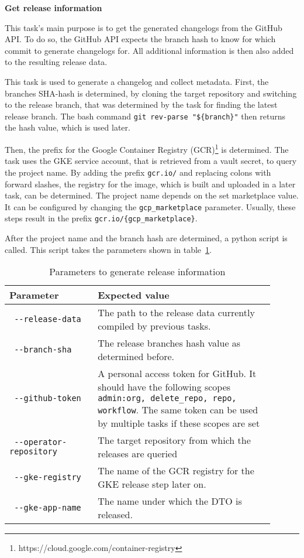 \textbf{Get release information}

This task's main purpose is to get the generated changelogs from the GitHub API.
To do so, the GitHub API expects the branch hash to know for which commit to generate changelogs for.
All additional information is then also added to the resulting release data.

This task is used to generate a changelog and collect metadata.
First, the branches SHA-hash is determined, by cloning the target repository and switching to the release branch, that was determined by the task for finding the latest release branch.
The bash command \verb|git rev-parse "${branch}"| then returns the hash value, which is used later.

Then, the prefix for the Google Container Registry (GCR)\footnote{https://cloud.google.com/container-registry} is determined.
The task uses the GKE service account, that is retrieved from a vault secret, to query the project name.
By adding the prefix \verb|gcr.io/| and replacing colons with forward slashes, the registry for the image, which is built and uploaded in a later task, can be determined.
The project name depends on the set marketplace value.
It can be configured by changing the \verb|gcp_marketplace| parameter.
Usually, these steps result in the prefix \verb|gcr.io/{gcp_marketplace}|.

After the project name and the branch hash are determined, a python script is called.
This script takes the parameters shown in table~\ref{tab:params-to-generate-release-information}.

\begin{table}[h]
    \centering
    \caption{Parameters to generate release information}
    \label{tab:params-to-generate-release-information}
    \begin{tabular}{p{0.3\linewidth}|p{0.6\linewidth}}
        Parameter & Expected value \\
        \hline
        \verb| --release-data | & The path to the release data currently compiled by previous tasks.  \\
        \verb| --branch-sha | & The release branches hash value as determined before. \\
        \verb| --github-token | & A personal access token for GitHub.
            It should have the following scopes \verb|admin:org, delete_repo, repo, workflow|.
            The same token can be used by multiple tasks if these scopes are set \\
        \verb| --operator-repository | & The target repository from which the releases are queried \\
        \verb| --gke-registry | & The name of the GCR registry for the GKE release step later on. \\
        \verb| --gke-app-name | & The name under which the DTO is released. \\
    \end{tabular}
\end{table}

